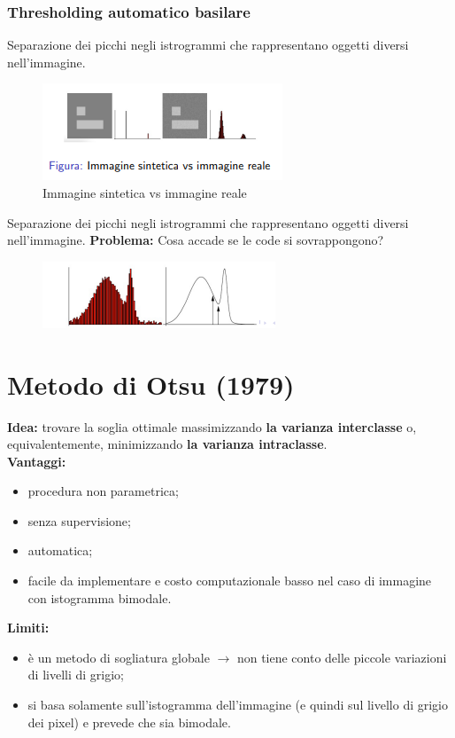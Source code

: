 \subsubsection{Thresholding automatico basilare}
Separazione dei picchi negli istrogrammi che rappresentano oggetti
diversi nell'immagine.
\begin{figure}[H]
    \centering
    \includegraphics[width=\linewidth, keepaspectratio]{capitoli/immagini/imgs/trash-automatico-basilare.png}
    \caption*{Immagine sintetica vs immagine reale}
\end{figure}
Separazione dei picchi negli istrogrammi che rappresentano oggetti diversi nell'immagine.
\textbf{Problema:} Cosa accade se le code si sovrappongono?
\begin{figure}[H]
    \centering
    \includegraphics[width=\linewidth, keepaspectratio]{capitoli/immagini/imgs/trash-automatico-basilare2.png}
\end{figure}
\section{Metodo di Otsu (1979)}
\textbf{Idea:} trovare la soglia ottimale massimizzando \textbf{la varianza
    interclasse} o, equivalentemente, minimizzando \textbf{la varianza
    intraclasse}.
\\\textbf{Vantaggi:}
\begin{itemize}
    \item procedura non parametrica;
    \item senza supervisione;
    \item automatica;
    \item facile da implementare e costo computazionale basso nel caso
          di immagine con istogramma bimodale.
\end{itemize}
\textbf{Limiti:}
\begin{itemize}
    \item è un metodo di sogliatura globale $\rightarrow$ non tiene conto delle
          piccole variazioni di livelli di grigio;
    \item si basa solamente sull'istogramma dell'immagine (e quindi sul
          livello di grigio dei pixel) e prevede che sia bimodale.
\end{itemize}

